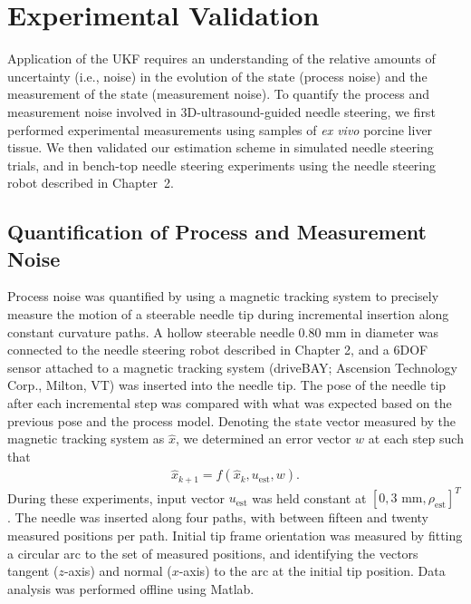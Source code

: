 \section{Experimental Validation}
\label{sec:AutonomousControl}
Application of the UKF requires an understanding of the relative amounts of uncertainty (i.e., noise) in the evolution of the state (process noise) and the measurement of the state (measurement noise). To quantify the process and measurement noise involved in 3D-ultrasound-guided needle steering, we first performed experimental measurements using samples of \textit{ex vivo} porcine liver tissue. We then validated our estimation scheme in simulated needle steering trials, and in bench-top needle steering experiments using the needle steering robot described in Chapter~2.

\subsection{Quantification of Process and Measurement Noise}
Process noise was quantified by using a magnetic tracking system to precisely measure the motion of a steerable needle tip during incremental insertion along constant curvature paths. A hollow steerable needle 0.80 mm in diameter was connected to the needle steering robot described in Chapter 2, and a 6DOF sensor attached to a magnetic tracking system (driveBAY; Ascension Technology Corp., Milton, VT) was inserted into the needle tip. The pose of the needle tip after each incremental step was compared with what was expected based on the previous pose and the process model. Denoting the state vector measured by the magnetic tracking system as $\hat{{x}}$, we determined an error vector ${w}$ at each step such that
\begin{align}
{\hat{x}_{k+1}} = f({\hat{x}_{k}}, {u_{\text{est}}}, {w}).
\end{align}
During these experiments, input vector ${u_{\text{est}}}$ was held constant at $[0, \text{3 mm}, \rho_{\text{est}}]^{T}$. The needle was inserted along four paths, with between fifteen and twenty measured positions per path. Initial tip frame orientation was measured by fitting a circular arc to the set of measured positions, and identifying the vectors tangent ($z$-axis) and normal ($x$-axis) to the arc at the initial tip position. Data analysis was performed offline using Matlab. 

